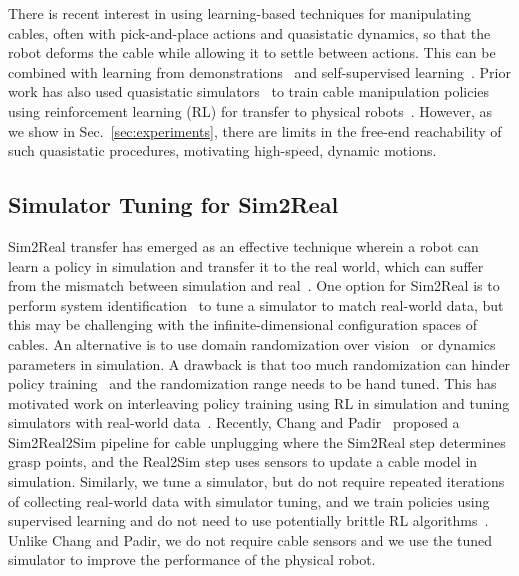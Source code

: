 \documentclass[letterpaper, 10pt, conference]{ieeeconf}  %
\newcommand{\remark}[3]{{\color{#2}[#1: #3]}}
\newcommand{\jeffi}[1]{\remark{JI}{red}{#1}}
\begin{document}
There is recent interest in using learning-based techniques for manipulating cables, often with pick-and-place actions and quasistatic dynamics, so that the robot deforms the cable while allowing it to settle between actions. This can be combined with learning from demonstrations~\cite{zeng_transporters_2020,seita_bags_2021} and self-supervised learning~\cite{nair_rope_2017,ZSVI_2018}.
Prior work has also used quasistatic simulators~\cite{corl2020softgym} to train cable manipulation policies using reinforcement learning (RL) for transfer to physical robots~\cite{lerrel_2020,yan_fabrics_latent_2020}. 
However, as we show in Sec.~\ref{sec:experiments}, there are limits in the free-end reachability of such quasistatic procedures, motivating high-speed, dynamic motions.


\subsection{Simulator Tuning for Sim2Real}

Sim2Real transfer has emerged as an effective technique wherein a robot can learn a policy in simulation and transfer it to the real world, which can suffer from the mismatch between simulation and real~\cite{reality_gap_1995}. One option for Sim2Real is to perform system identification~\cite{sys_id} to tune a simulator to match real-world data, but this may be challenging with the infinite-dimensional configuration spaces of cables.
An alternative is to use domain randomization over vision~\cite{domain_randomization,cad2rl} or dynamics~\cite{dynamics_randomization_2018} parameters in simulation.
A drawback is that too much randomization can hinder policy training~\cite{sim2real_deform_2018} and the randomization range needs to be hand tuned.
This has motivated work on interleaving policy training using RL in simulation and tuning simulators with real-world data~\cite{closing_sim2real_2019,auto-tune_2021}. Recently, Chang and Padir~\cite{sim2real2sim_2020} proposed a Sim2Real2Sim pipeline for cable unplugging where the Sim2Real step determines grasp points, and the Real2Sim step uses sensors to update a cable model in simulation.
Similarly, we tune a simulator, but do not require repeated iterations of collecting real-world data with simulator tuning, and we train policies using supervised learning and do not need to use potentially brittle RL algorithms~\cite{SpinningUp2018,how_to_train_rl}. Unlike Chang and Padir, we do not require cable sensors and we use the tuned simulator to improve the performance of the physical robot.
\end{document}
